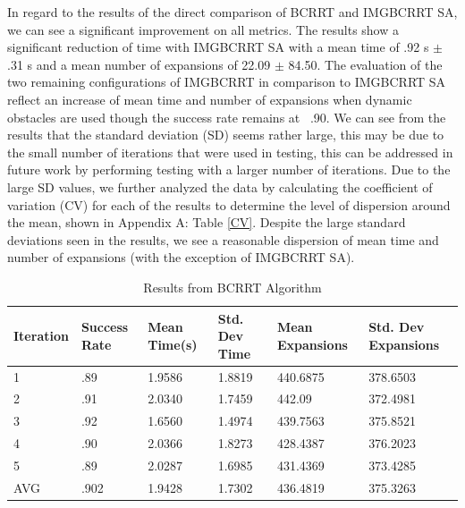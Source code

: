 \documentclass{article}
\begin{document}
In regard to the results of the direct comparison of BCRRT and IMGBCRRT SA, we can see a significant improvement on all metrics. The results show a significant reduction of time with IMGBCRRT SA with a mean time of .92 s $\pm$ .31 s and a mean number of expansions of 22.09 $\pm$ 84.50. The evaluation of the two remaining configurations of IMGBCRRT in comparison to IMGBCRRT SA reflect an increase of mean time and number of expansions when dynamic obstacles are used though the success rate remains at ~.90. We can see from the results that the standard deviation (SD) seems rather large, this may be due to the small number of iterations that were used in testing, this can be addressed in future work by performing testing with a larger number of iterations. Due to the large SD values, we further analyzed the data by calculating the coefficient of variation (CV) for each of the results to determine the level of dispersion around the mean, shown in Appendix A: Table \ref{CV}. Despite the large standard deviations seen in the results, we see a reasonable dispersion of mean time and number of expansions (with the exception of IMGBCRRT SA). 

\begin{table}[h]
  \caption{Results from BCRRT Algorithm}
  \label{BCRRT Results}
  \centering
  \begin{tabular}{llllll}
    \cmidrule(r){1-6}
   Iteration & Success Rate & Mean Time(s) & Std. Dev Time & Mean Expansions & Std. Dev Expansions\\
    \midrule
    1 & .89 & 1.9586 & 1.8819 & 440.6875 & 378.6503 \\
    2 & .91 & 2.0340 & 1.7459 & 442.09 & 372.4981 \\
    3 & .92 & 1.6560 & 1.4974 & 439.7563 & 375.8521 \\
    4 & .90 & 2.0366 & 1.8273 & 428.4387 & 376.2023 \\
    5 & .89 & 2.0287 & 1.6985 & 431.4369 & 373.4285 \\
 \midrule
  AVG & .902 & 1.9428 & 1.7302 & 436.4819 & 375.3263 \\
    \bottomrule
  \end{tabular}
\end{table}
\end{document}
